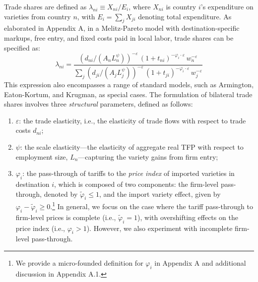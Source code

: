 \documentclass[12pt]{article}
\begin{document}
Trade shares are defined as $\lambda_{ni} \equiv X_{ni}/E_i$, where $X_{ni}$ is country $i$'s expenditure on varieties from country $n$, with $E_i=\sum_{j} X_{ji}$ denoting total expenditure. As elaborated in Appendix A, in a Melitz-Pareto model with destination-specific markups, free entry, and fixed costs paid in local labor, trade shares can be specified as:
\begin{equation} \label{eq: eq_1}
\lambda_{ni}=\frac{\left(d_{ni}/(A_{n}L_{n}^{\psi})\right)^{-\varepsilon}\,(1+t_{ni})^{-\varphi_i\cdot\varepsilon}\,w_{n}^{-\varepsilon}}{\sum_{j}\left(d_{ji}/(A_{j}L_{j}^{\psi})\right)^{-\varepsilon}\,(1+t_{ji})^{-\varphi_i\cdot\varepsilon}\,w_{j}^{-\varepsilon}}
\end{equation}
This expression also encompasses a range of standard models, such as Armington, Eaton-Kortum, and Krugman, as special cases. The formulation of bilateral trade shares involves three \textit{structural} parameters, defined as follows:
\begin{enumerate}
    \item $\varepsilon$: the trade elasticity, i.e., the elasticity of trade flows with respect to trade costs $d_{ni}$;
    \item     $\psi$: the scale elasticity---the elasticity of aggregate real TFP with respect to employment size, $L_{n}$---capturing the variety gains from firm entry;
    \item $\varphi_i$: the pass-through of tariffs to the \textit{price index} of imported varieties in destination $i$, which is composed of two components: the firm-level pass-through, denoted by $\tilde{\varphi}_i \leq 1$, and the import variety effect, given by $\varphi_i - \tilde{\varphi}_i \geq 0$.\footnote{We provide a micro-founded definition for $\varphi_i$ in Appendix A and additional discussion in Appendix A.1. %
    } In general, we focus on the case where the tariff pass-through to firm-level prices is complete (i.e., $\tilde{\varphi}_i = 1$), with overshifting effects on the price index (i.e., $\varphi_i > 1$). However, we also experiment with incomplete firm-level pass-through.   
\end{enumerate}
\end{document}
